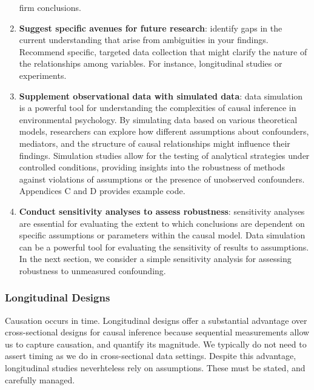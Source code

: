 \documentclass[
  singlecolumn]{article}
\begin{document}
\begin{enumerate}
  firm conclusions.
\item
  \textbf{Suggest specific avenues for future research}: identify gaps
  in the current understanding that arise from ambiguities in your
  findings. Recommend specific, targeted data collection that might
  clarify the nature of the relationships among variables. For instance,
  longitudinal studies or experiments.
\item
  \textbf{Supplement observational data with simulated data}: data
  simulation is a powerful tool for understanding the complexities of
  causal inference in environmental psychology. By simulating data based
  on various theoretical models, researchers can explore how different
  assumptions about confounders, mediators, and the structure of causal
  relationships might influence their findings. Simulation studies allow
  for the testing of analytical strategies under controlled conditions,
  providing insights into the robustness of methods against violations
  of assumptions or the presence of unobserved confounders. Appendices C
  and D provides example code.
\item
  \textbf{Conduct sensitivity analyses to assess robustness}:
  sensitivity analyses are essential for evaluating the extent to which
  conclusions are dependent on specific assumptions or parameters within
  the causal model. Data simulation can be a powerful tool for
  evaluating the sensitivity of results to assumptions. In the next
  section, we consider a simple sensitivity analysis for assessing
  robustness to unmeasured confounding.
\end{enumerate}

\subsubsection{Longitudinal Designs}\label{longitudinal-designs}

Causation occurs in time. Longitudinal designs offer a substantial
advantage over cross-sectional designs for causal inference because
sequential measurements allow us to capture causation, and quantify its
magnitude. We typically do not need to assert timing as we do in
cross-sectional data settings. Despite this advantage, longitudinal
studies neverhteless rely on assumptions. These must be stated, and
carefully managed.
\end{document}
